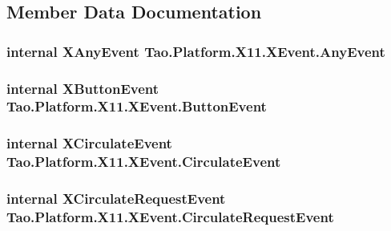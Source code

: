 \subsection{Member Data Documentation}
\hypertarget{struct_tao_1_1_platform_1_1_x11_1_1_x_event_aee6f3fdea0dfef478445ec9733ab49ee}{
\subsubsection[{AnyEvent}]{\setlength{\rightskip}{0pt plus 5cm}internal {\bf XAnyEvent} {\bf Tao.Platform.X11.XEvent.AnyEvent}}}
\label{struct_tao_1_1_platform_1_1_x11_1_1_x_event_aee6f3fdea0dfef478445ec9733ab49ee}
\hypertarget{struct_tao_1_1_platform_1_1_x11_1_1_x_event_ac846ecdffbd752f194088619b1ea4fa7}{
\subsubsection[{ButtonEvent}]{\setlength{\rightskip}{0pt plus 5cm}internal {\bf XButtonEvent} {\bf Tao.Platform.X11.XEvent.ButtonEvent}}}
\label{struct_tao_1_1_platform_1_1_x11_1_1_x_event_ac846ecdffbd752f194088619b1ea4fa7}
\hypertarget{struct_tao_1_1_platform_1_1_x11_1_1_x_event_a06c575f23bbbb3649aa23773a47e0ba5}{
\subsubsection[{CirculateEvent}]{\setlength{\rightskip}{0pt plus 5cm}internal {\bf XCirculateEvent} {\bf Tao.Platform.X11.XEvent.CirculateEvent}}}
\label{struct_tao_1_1_platform_1_1_x11_1_1_x_event_a06c575f23bbbb3649aa23773a47e0ba5}
\hypertarget{struct_tao_1_1_platform_1_1_x11_1_1_x_event_a99cfeb745e24817ab71044d16e1a0541}{
\subsubsection[{CirculateRequestEvent}]{\setlength{\rightskip}{0pt plus 5cm}internal {\bf XCirculateRequestEvent} {\bf Tao.Platform.X11.XEvent.CirculateRequestEvent}}}
